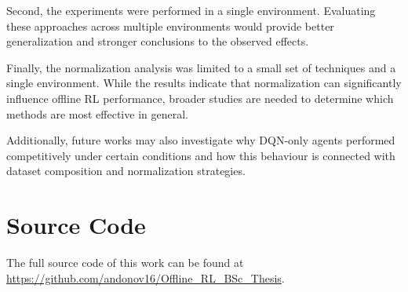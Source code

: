 Second, the experiments were performed in a single environment. Evaluating these approaches across multiple environments would provide better generalization and stronger conclusions to the observed effects.

Finally, the normalization analysis was limited to a small set of techniques and a single environment. While the results indicate that normalization can significantly influence offline RL performance, broader studies are needed to determine which methods are most effective in general.

Additionally, future works may also investigate why DQN-only agents performed competitively under certain conditions and how this behaviour is connected with dataset composition and normalization strategies.



\section{Source Code}
 The full source code of this work can be found at \url{https://github.com/andonov16/Offline_RL_BSc_Thesis}.

